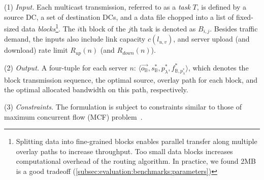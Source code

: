 
\noindent(1) {\em Input.}%
Each multicast transmission, referred to as a {\em task} $T$, is defined
by a source DC, a set of destination DCs, and a data file chopped into
a list of fixed-sized data
{\em blocks}\footnote{Splitting data into fine-grained blocks enables
parallel transfer along
multiple overlay paths to increase throughput. Too small data blocks
increases computational overhead of the routing algorithm.
In practice, we found 2MB is a good tradeoff
(\Section\ref{subsec:evaluation:benchmarks:parameters})}.
The $i$th block of the $j$th task is denoted as $B_{i,j}$.
Besides traffic demand, the inputs also include link capacity $c(l_{u,v})$, and
server upload (and download) rate limit $R_{up}(n)$ (and $R_{down}(n)$). %

\noindent(2) {\em Output.} A four-tuple for each server $n$: $\langle \overrightarrow{o_\mathbb{B}}, s_{\mathbb{B}}^*, p_{\lambda}^*, f^*_{\mathbb{B},p_{\lambda}^*} \rangle$, which denotes the block transmission sequence, the optimal source, overlay path for each block, and the optimal allocated bandwidth on this path, respectively. %

\noindent(3) {\em Constraints.}
The formulation is subject to constraints similar to those of maximum concurrent flow (MCF) problem~\cite{garg2007faster}.%

